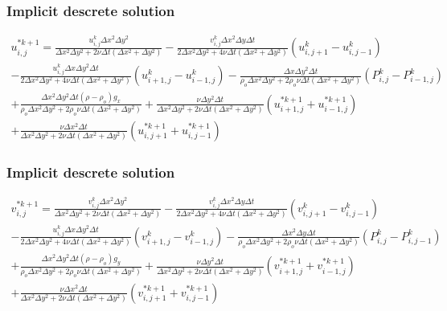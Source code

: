 \documentclass[xcolor=dvipsnames,10pt,aspectratio=169]{beamer}
\begin{document}
\begin{frame}
	\frametitle{Implicit descrete solution}
	\begin{equation}
		\begin{split}
		u_{i , j}^{\ast k + 1} = \frac{u_{i , j}^{k} \Delta x ^2 \Delta y^2}{ \Delta x ^2 \Delta y^2 + 2 \nu \Delta t(\Delta x ^2 + \Delta y^2)} - \frac{ v_{i , j}^{k} \Delta x ^2 \Delta y \Delta t}{ 2 \Delta x ^2 \Delta y^2 + 4 \nu \Delta t(\Delta x ^2 + \Delta y^2)} \left( u_{i , j+ 1}^k - u_{i, j-1}^k   \right)  \\ - \frac{u_{i , j}^{k} \Delta x \Delta y^2 \Delta t}{ 2 \Delta x ^2 \Delta y^2 + 4 \nu \Delta t(\Delta x ^2 + \Delta y^2)} \left(u_{i + 1 , j}^k - u_{i - 1 , j}^k \right) - \frac{ \Delta x \Delta y^2 \Delta t}{ \rho_o \Delta x ^2 \Delta y^2 + 2 \rho_o \nu \Delta t(\Delta x ^2 + \Delta y^2)} (P_{i, j}^k - P_{i - 1 , j}^k ) \\ + \frac{ \Delta x ^2 \Delta y^2 \Delta t (\rho -\rho_o) g_x }{ \rho_o \Delta x ^2 \Delta y^2 + 2 \rho_o \nu \Delta t(\Delta x ^2 + \Delta y^2)} + \frac{ \nu \Delta y^2 {\Delta t}}{ \Delta x ^2 \Delta y^2 + 2 \nu \Delta t(\Delta x ^2 + \Delta y^2)} \left( u_{i+1 , j}^{\ast k + 1} + u_{i-1,j}^{\ast k + 1} \right) \\ + \frac{ \nu \Delta x^2 {\Delta t}}{ \Delta x ^2 \Delta y^2 + 2 \nu \Delta t(\Delta x ^2 + \Delta y^2)} \left( u_{i , j+1}^{\ast k + 1} + u_{i,j-1}^{\ast k + 1}\right)
		\end{split}
	\end{equation}

\end{frame}

\begin{frame}
	\frametitle{Implicit descrete solution}
	\begin{equation}
		\begin{split}
		v_{i , j}^{\ast k + 1} = \frac{v_{i , j}^{k} \Delta x ^2 \Delta y^2}{ \Delta x ^2 \Delta y^2 + 2 \nu \Delta t(\Delta x ^2 + \Delta y^2)} - \frac{ v_{i , j}^{k} \Delta x ^2 \Delta y \Delta t}{ 2 \Delta x ^2 \Delta y^2 + 4 \nu \Delta t(\Delta x ^2 + \Delta y^2)} \left( v_{i , j+ 1}^k - v_{i, j-1}^k   \right)  \\ - \frac{u_{i , j}^{k} \Delta x \Delta y^2 \Delta t}{ 2 \Delta x ^2 \Delta y^2 + 4 \nu \Delta t(\Delta x ^2 + \Delta y^2)} \left(v_{i + 1 , j}^k - v_{i - 1 , j}^k \right) - \frac{ \Delta x^2 \Delta y \Delta t}{ \rho_o \Delta x ^2 \Delta y^2 + 2 \rho_o \nu \Delta t(\Delta x ^2 + \Delta y^2)} (P_{i, j}^k - P_{i , j-1}^k ) \\ + \frac{ \Delta x ^2 \Delta y^2 \Delta t (\rho -\rho_o) g_y }{ \rho_o \Delta x ^2 \Delta y^2 + 2 \rho_o \nu \Delta t(\Delta x ^2 + \Delta y^2)} + \frac{ \nu \Delta y^2 {\Delta t}}{ \Delta x ^2 \Delta y^2 + 2 \nu \Delta t(\Delta x ^2 + \Delta y^2)} \left( v_{i+1 , j}^{\ast k + 1} + v_{i-1,j}^{\ast k + 1} \right) \\ + \frac{ \nu \Delta x^2 {\Delta t}}{ \Delta x ^2 \Delta y^2 + 2 \nu \Delta t(\Delta x ^2 + \Delta y^2)} \left( v_{i , j+1}^{\ast k + 1} + v_{i,j-1}^{\ast k + 1}\right)
		\end{split}
	\end{equation}
\end{frame}
\end{document}
